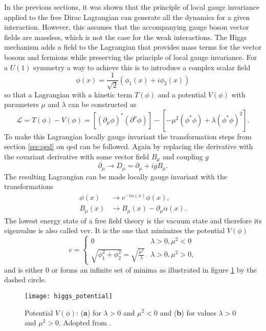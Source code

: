 In the previous sections, it was shown that the principle of local gauge invariance applied to the free Dirac Lagrangian can generate all the dynamics for a given interaction. However, this assumes that the accompanying gauge boson vector fields are massless, which is not the case for the weak interactions. The Higgs mechanism adds a field to the Lagrangian that provides mass terms for the vector bosons and fermions while preserving the principle of local gauge invariance. For a $U(1)$ symmetry a way to achieve this is to introduce a complex scalar field
\begin{equation}
    \phi (x)=\frac{1}{\sqrt{2}}(\phi_1(x)+i\phi_2(x))
\end{equation}
so that a Lagrangian with a kinetic term $T(\phi)$ and a potential $V(\phi)$ with parameters $\mu$ and $\lambda$ can be constructed as
\begin{equation}
    \mathcal{L}=T(\phi)-V(\phi)=
    \left[\left(\partial_\mu\phi\right)^* (\partial^\mu\phi)\right]
    -\left[
        -\mu^2(\phi^*\phi)+\lambda(\phi^*\phi)^2
        \right].
\end{equation}
To make this Lagrangian locally gauge invariant the transformation steps from section \ref{sec:qed} on \ac{qed} can be followed. Again by replacing the derivative with the covariant derivative with some vector field $B_\mu$ and coupling $g$
\begin{equation}
    \partial_\mu \rightarrow D_\mu = \partial_\mu + ig B_\mu.
\end{equation}
The resulting Lagrangian can be made locally gauge invariant with the transformations
\begin{align}
    \phi(x)  & \rightarrow  e^{-i \alpha(x)}\phi(x), \label{eq:scalar_local_gauge} \\
    B_\mu(x) & \xrightarrow{} B_\mu(x) -\partial_\mu\alpha(x).
\end{align}
The lowest energy state of a free field theory is the vacuum state and therefore its eigenvalue is also called \ac{vev}. It is the one that minimizes the potential $V(\phi)$
\begin{equation}
    v =
    \begin{cases}
        0                                                     & \lambda>0, \mu^2<0  \\
        \sqrt{\phi_1^2+\phi_2^2}=\sqrt{\frac{\mu^2}{\lambda}} & \lambda>0, \mu^2>0,
    \end{cases}
\end{equation}
and is either 0 or forms an infinite set of minima as illustrated in figure \ref{fig:higgs_potential} by the dashed circle.
\begin{figure}
    \centering
    \texttt{[image: higgs\_potential]}
    \caption[]{Potential $V(\phi)$: (\textbf{a}) for $\lambda>0$ and $\mu^2<0$ and (\textbf{b}) for values $\lambda>0$ and $\mu^2>0$. Adopted from \citep{thomson2013modern}.}
    \label{fig:higgs_potential}
\end{figure}

